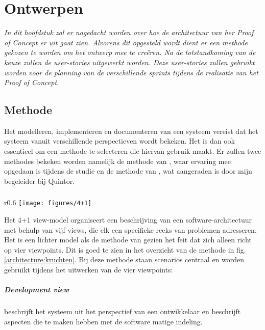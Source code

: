 \chapter{Ontwerpen}

\textit{In dit hoofdstuk zal er nagedacht worden over hoe de architectuur van her Proof of Concept er uit gaat zien. Alvorens dit opgesteld wordt dient er een methode gekozen te worden om het ontwerp mee te creëren. Na de totstandkoming van de keuze zullen de user-stories uitgewerkt worden. Deze user-stories zullen gebruikt worden voor de planning van de verschillende sprints tijdens de realisatie van het Proof of Concept.}

\section{Methode}

Het modelleren, implementeren en documenteren van een systeem vereist dat het systeem vanuit verschillende perspectieven wordt bekeken. Het is dan ook essentieel om een methode te selecteren die hiervan gebruik maakt. Er zullen twee methodes bekeken worden namelijk de methode van \cite{rozanski2012software}, waar ervaring mee opgedaan is tijdens de studie en de methode van \cite{kruchten19954+}, wat aangeraden is door mijn begeleider bij Quintor.

\subsection{\citeauthor{kruchten19954+}}

\begin{wrapfigure}{r}{0.6\textwidth}
    \texttt{[image: figures/4+1]}
    \caption[4+1 view-model]{Het 4+1 view-model volgens \cite{kruchten19954+}.}
    \label{architecture:kruchten}
\end{wrapfigure}  

Het 4+1 view-model organiseert een beschrijving van een software-architectuur met behulp van vijf views, die elk een specifieke reeks van problemen adresseren. Het is een lichter model als de methode van \cite{rozanski2012software} gezien het feit dat \cite{kruchten19954+} zich alleen richt op vier viewpoints. Dit is goed te zien in het overzicht van de methode in fig. \ref{architecture:kruchten}. Bij deze methode staan scenarios centraal en worden gebruikt tijdens het uitwerken van de vier viewpoints:

\paragraph{Development view} beschrijft het systeem uit het perspectief van een ontwikkelaar en beschrijft aspecten die te maken hebben met de software matige indeling.

